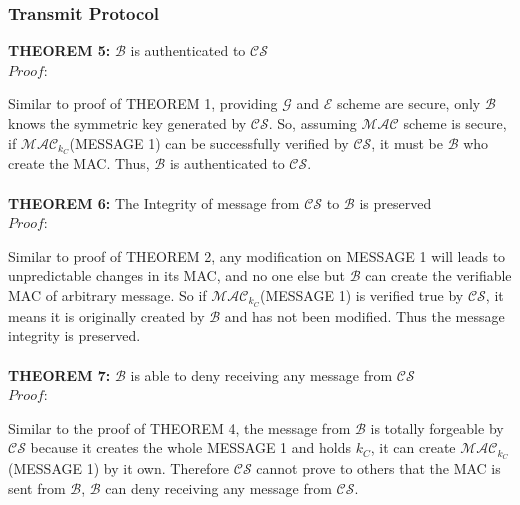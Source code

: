 \documentclass[10pt,a4paper]{article}
\begin{document}
\subsubsection*{Transmit Protocol}
\textbf{THEOREM 5:} $\mathcal{B}$ is authenticated to $\mathcal{CS}$ \\
\emph{$Proof:$} \par
Similar to proof of THEOREM 1, providing $\mathcal{G}$ and $\mathcal{E}$ scheme are secure, only $\mathcal{B}$ knows the symmetric key generated by $\mathcal{CS}$. So, assuming $\mathcal{MAC}$ scheme is secure, if $\mathcal{MAC}_{k_C}$(MESSAGE 1) can be successfully verified by $\mathcal{CS}$, it must be $\mathcal{B}$ who create the MAC. Thus, $\mathcal{B}$ is authenticated to $\mathcal{CS}$.
\\
\\
\textbf{THEOREM 6:} The Integrity of message from $\mathcal{CS}$ to $\mathcal{B}$ is preserved \\
\emph{$Proof:$} \par
Similar to proof of THEOREM 2, any modification on MESSAGE 1 will leads to unpredictable changes in its MAC, and no one else but $\mathcal{B}$ can create the verifiable MAC of arbitrary message. So if $\mathcal{MAC}_{k_C}$(MESSAGE 1) is verified true by $\mathcal{CS}$, it means it is originally created by $\mathcal{B}$ and has not been modified. Thus the message integrity is preserved.
\\
\\
\textbf{THEOREM 7:} $\mathcal{B}$ is able to deny receiving any message from $\mathcal{CS}$ \\
\emph{$Proof:$} \par
Similar to the proof of THEOREM 4, the message from $\mathcal{B}$ is totally forgeable by $\mathcal{CS}$ because it creates the whole MESSAGE 1 and holds $k_C$, it can create $\mathcal{MAC}_{k_C}$(MESSAGE 1) by it own. Therefore $\mathcal{CS}$ cannot prove to others that the MAC is sent from $\mathcal{B}$, $\mathcal{B}$ can deny receiving any message from $\mathcal{CS}$.
\end{document}
